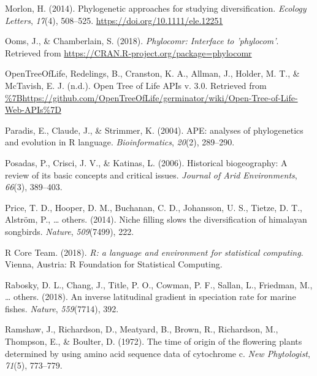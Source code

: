 \documentclass[
  english,
  man]{apa6}
\newlength{\cslhangindent}
\newlength{\cslentryspacingunit} %
\newenvironment{CSLReferences}[2] %
 {%
  \setlength{\parindent}{0pt}
  \ifodd #1
  \let\oldpar\par
  \def\par{\hangindent=\cslhangindent\oldpar}
  \fi
  \setlength{\parskip}{#2\cslentryspacingunit}
 }%
 {}
\begin{document}
\begin{CSLReferences}{1}{0}
\leavevmode{}%
Morlon, H. (2014). {Phylogenetic approaches for studying diversification.} \emph{Ecology Letters}, \emph{17}(4), 508--525. \url{https://doi.org/10.1111/ele.12251}

\leavevmode{}%
Ooms, J., \& Chamberlain, S. (2018). \emph{Phylocomr: Interface to 'phylocom'}. Retrieved from \url{https://CRAN.R-project.org/package=phylocomr}

\leavevmode{}%
OpenTreeOfLife, Redelings, B., Cranston, K. A., Allman, J., Holder, M. T., \& McTavish, E. J. (n.d.). {Open Tree of Life APIs v. 3.0}. Retrieved from \url{\%7Bhttps://github.com/OpenTreeOfLife/germinator/wiki/Open-Tree-of-Life-Web-APIs\%7D}

\leavevmode{}%
Paradis, E., Claude, J., \& Strimmer, K. (2004). {APE: analyses of phylogenetics and evolution in R language}. \emph{Bioinformatics}, \emph{20}(2), 289--290.

\leavevmode{}%
Posadas, P., Crisci, J. V., \& Katinas, L. (2006). Historical biogeography: A review of its basic concepts and critical issues. \emph{Journal of Arid Environments}, \emph{66}(3), 389--403.

\leavevmode{}%
Price, T. D., Hooper, D. M., Buchanan, C. D., Johansson, U. S., Tietze, D. T., Alström, P., \ldots{} others. (2014). Niche filling slows the diversification of himalayan songbirds. \emph{Nature}, \emph{509}(7499), 222.

\leavevmode{}%
R Core Team. (2018). \emph{{R: a language and environment for statistical computing}}. Vienna, Austria: R Foundation for Statistical Computing.

\leavevmode{}%
Rabosky, D. L., Chang, J., Title, P. O., Cowman, P. F., Sallan, L., Friedman, M., \ldots{} others. (2018). An inverse latitudinal gradient in speciation rate for marine fishes. \emph{Nature}, \emph{559}(7714), 392.

\leavevmode{}%
Ramshaw, J., Richardson, D., Meatyard, B., Brown, R., Richardson, M., Thompson, E., \& Boulter, D. (1972). The time of origin of the flowering plants determined by using amino acid sequence data of cytochrome c. \emph{New Phytologist}, \emph{71}(5), 773--779.


\end{CSLReferences}
\end{document}
